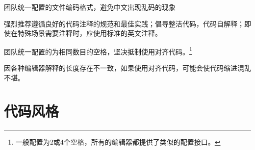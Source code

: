 \begin{content}
\begin{regulation}
团队统一配置的文件编码格式，避免中文出现乱码的现象
\end{regulation}

强烈推荐遵循良好的代码注释的规范和最佳实践；倡导整洁代码，代码自解释；即使在特殊场景需要注释时，应使用标准的英文注释。

\begin{regulation}
团队统一配置的为相同数目的空格，坚决抵制使用对齐代码。\footnote{一般配置为2或4个空格，所有的编辑器都提供了类似的配置接口。}
\end{regulation}

因各种编辑器解释的长度存在不一致，如果使用对齐代码，可能会使代码缩进混乱不堪。

\end{content}

\section{代码风格}

